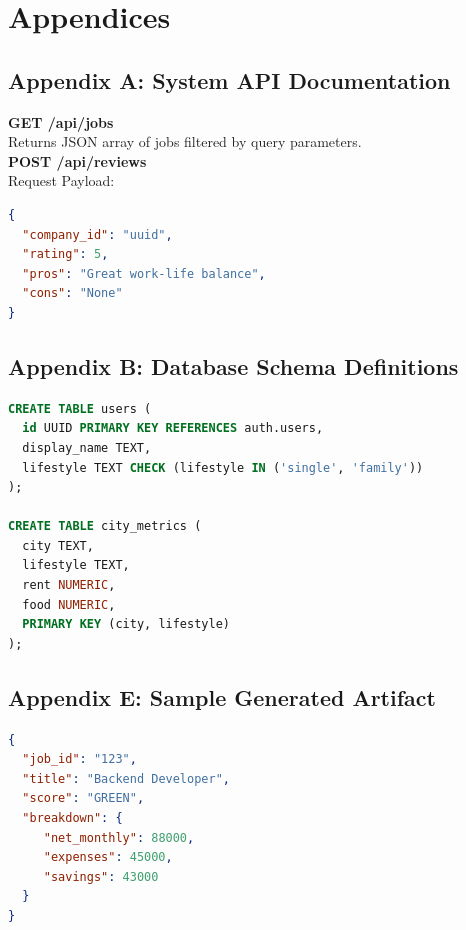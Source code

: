 \chapter{Appendices}

\section*{Appendix A: System API Documentation}

\textbf{GET /api/jobs} \\
Returns JSON array of jobs filtered by query parameters. \\

\textbf{POST /api/reviews} \\
Request Payload:
\begin{lstlisting}[language=json]
{
  "company_id": "uuid",
  "rating": 5,
  "pros": "Great work-life balance",
  "cons": "None"
}
\end{lstlisting}

\section*{Appendix B: Database Schema Definitions}

\begin{lstlisting}[language=SQL]
CREATE TABLE users (
  id UUID PRIMARY KEY REFERENCES auth.users,
  display_name TEXT,
  lifestyle TEXT CHECK (lifestyle IN ('single', 'family'))
);

CREATE TABLE city_metrics (
  city TEXT,
  lifestyle TEXT,
  rent NUMERIC,
  food NUMERIC,
  PRIMARY KEY (city, lifestyle)
);
\end{lstlisting}

\section*{Appendix E: Sample Generated Artifact}

\begin{lstlisting}[language=json]
{
  "job_id": "123",
  "title": "Backend Developer",
  "score": "GREEN",
  "breakdown": {
     "net_monthly": 88000,
     "expenses": 45000,
     "savings": 43000
  }
}
\end{lstlisting}
